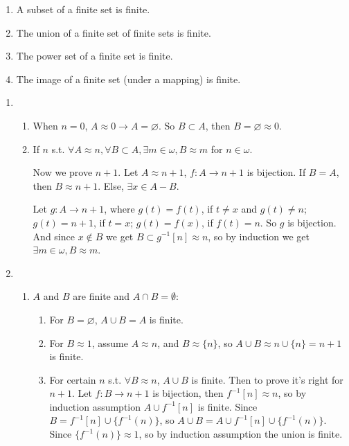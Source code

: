 \documentclass{ctexart}
\begin{document}
\newcommand{\peq}{\preccurlyeq}
\newcommand{\set}{\mathbb{S}et}
\begin{problem}
\begin{enumerate}[ref=\theproblem.\arabic*]
\item\label{it:2.1} A subset of a finite set is finite.
\item\label{it:2.2} The union of a finite set of finite sets is finite.
\item The power set of a finite set is finite.
\item The image of a finite set (under a mapping) is finite.
\end{enumerate}
\end{problem}

\begin{solution}
    \begin{enumerate}
     \item \begin{enumerate}
        \item When $n=0$, $A\approx 0\to A=\varnothing$. So $B\subset A$, then $B=\varnothing\approx 0$.
        \item If $n$ s.t. $\forall A\approx n,\forall B\subset A,\exists m\in \omega,B\approx m$ for $n\in \omega$. 
        
        Now we prove $n+1$. Let $A\approx n+1$, $f:A\to n+1$ is bijection. If $B=A$, then $B\approx n+1$. Else, $\exists x\in A\minus B$. 
       
        Let $g:A\to n+1$, where $g(t)=f(t)$, if $t\neq x$ and $g(t)\neq n$; $g(t)=n+1$, if $t=x$; $g(t)=f(x)$, if $f(t)=n$. So $g$ is bijection. And since $x\notin B$ we get $B\subset g^{-1}[n]\approx n$, so by induction we get $\exists m\in \omega,B\approx m$. 
     
     \end{enumerate}
      
     \item \begin{enumerate}
        \item $A$ and $B$ are finite and $A\cap B=\emptyset$:
            \begin{enumerate}
                \item For $B=\varnothing$, $A\cup B=A$ is finite.
                \item For $B\approx 1$, assume $A\approx n$, and $B\approx \{n\}$, so $A\cup B\approx n\cup\{n\}=n+1$ is finite. 
                \item For certain $n$ s.t. $\forall B\approx n$, $A\cup B$ is finite. Then to prove it's right for $n+1$. Let $f:B\to n+1$ is bijection, then $f^{-1}[n]\approx n$, so by induction assumption $A\cup f^{-1}[n]$ is finite. Since $B=f^{-1}[n]\cup\{f^{-1}(n)\}$, so $A\cup B=A\cup f^{-1}[n]\cup\{f^{-1}(n)\}$. Since $\{f^{-1}(n)\}\approx 1$, so by induction assumption the union is finite.
                

\end{enumerate}
\end{enumerate}
\end{enumerate}
\end{solution}
\end{document}
